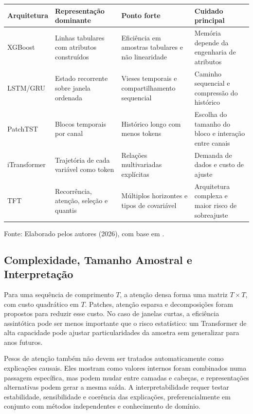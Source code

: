 \begin{quadro}[H]
\caption{Vieses indutivos de arquiteturas para séries temporais}
\label{qua:arquiteturas_series}
\centering
\small
\begin{tabular}{p{2.8cm} p{4.0cm} p{4.0cm} p{3.5cm}}
\toprule
\textbf{Arquitetura} & \textbf{Representação dominante} & \textbf{Ponto forte} & \textbf{Cuidado principal} \\
\midrule
XGBoost & Linhas tabulares com atributos construídos & Eficiência em amostras tabulares e não linearidade & Memória depende da engenharia de atributos \\
LSTM/GRU & Estado recorrente sobre janela ordenada & Vieses temporais e compartilhamento sequencial & Caminho sequencial e compressão do histórico \\
PatchTST & Blocos temporais por canal & Histórico longo com menos tokens & Escolha do tamanho do bloco e interação entre canais \\
iTransformer & Trajetória de cada variável como token & Relações multivariadas explícitas & Demanda de dados e custo de ajuste \\
TFT & Recorrência, atenção, seleção e quantis & Múltiplos horizontes e tipos de covariável & Arquitetura complexa e maior risco de sobreajuste \\
\bottomrule
\end{tabular}
\normalsize
\par\smallskip
{\small Fonte: Elaborado pelos autores (2026), com base em \cite{lim2021temporal, nie2023patchtst, liu2024itransformer}.\par}
\end{quadro}

\subsection{Complexidade, Tamanho Amostral e Interpretação}

Para uma sequência de comprimento $T$, a atenção densa forma uma matriz $T\times T$, com custo quadrático em $T$. Patches, atenção esparsa e decomposições foram propostos para reduzir esse custo. No caso de janelas curtas, a eficiência assintótica pode ser menos importante que o risco estatístico: um Transformer de alta capacidade pode ajustar particularidades da amostra sem generalizar para anos futuros.

Pesos de atenção também não devem ser tratados automaticamente como explicações causais. Eles mostram como valores internos foram combinados numa passagem específica, mas podem mudar entre camadas e cabeças, e representações alternativas podem gerar a mesma saída. A interpretabilidade requer testar estabilidade, sensibilidade e coerência das explicações, preferencialmente em conjunto com métodos independentes e conhecimento de domínio.

